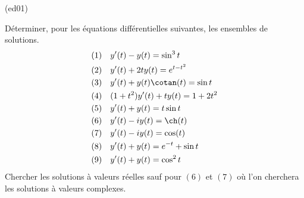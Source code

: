 \begin{tiny}(ed01)\end{tiny}
Déterminer, pour les équations différentielles suivantes, les ensembles de solutions.
\begin{align*}
(1)& & &y'(t)-y(t) = \sin^3t \\
(2)& & &y'(t)+2ty(t) = e^{t-t^2} \\
(3)& & &y'(t) + y(t) \cotan (t) = \sin t \\
(4)& & &(1+t^2)y'(t)+ty(t) = 1+2t^2 \\
(5)& & &y'(t) + y(t) = t\sin t \\
(6)& & &y'(t)-iy(t) = \ch(t) \\
(7)& & &y'(t)-iy(t) = \cos (t)\\
(8)& & &y'(t) + y(t) = e^{-t} + \sin t \\
(9)& & &y'(t) + y(t) = \cos^2 t 
\end{align*}
Chercher les solutions à valeurs réelles sauf pour $(6)$ et $(7)$ où l'on cherchera les solutions à valeurs complexes.